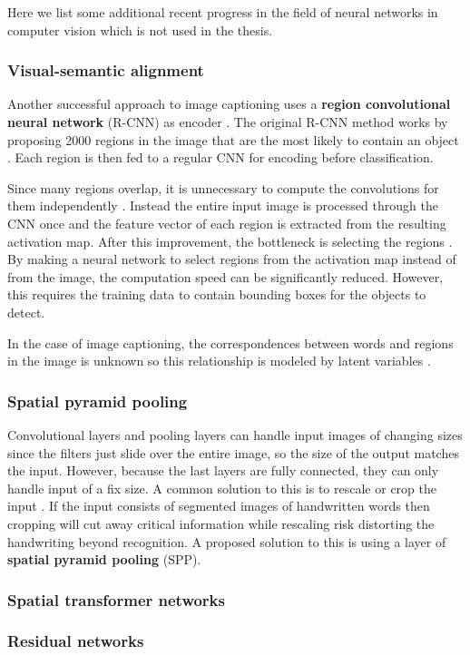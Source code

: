 Here we list some additional recent progress in the field of neural networks in computer vision which is not used in the thesis.

\subsubsection{Visual-semantic alignment}


Another successful approach to image captioning uses a \textbf{region convolutional neural network} (R-CNN) as encoder \cite{VisualSemanticAlignment}.
The original R-CNN method works by proposing 2000 regions in the image that are the most likely to contain an object \cite{RCNN}. Each region is then fed to a regular CNN for encoding before classification.

Since many regions overlap, it is unnecessary to compute the convolutions for them independently \cite{FastRCNN}. Instead the entire input image is processed through the CNN once and the feature vector of each region is extracted from the resulting activation map. After this improvement, the bottleneck is selecting the regions \cite{FasterRCNN}. By making a neural network to select regions from the activation map instead of from the image, the computation speed can be significantly reduced. However, this requires the training data to contain bounding boxes for the objects to detect.

In the case of image captioning, the correspondences between words and regions in the image is unknown so this relationship is modeled by latent variables \cite{VisualSemanticAlignment}.

\subsubsection{Spatial pyramid pooling}

Convolutional layers and pooling layers can handle input images of changing sizes since the filters just slide over the entire image, so the size of the output matches the input.
However, because the last layers are fully connected, they can only handle input of a fix size. A common solution to this is to rescale or crop the input \cite{FornesCnnCategorization}. If the input consists of segmented images of handwritten words then cropping will cut away critical information while rescaling risk distorting the handwriting beyond recognition. A proposed solution to this is using a layer of \textbf{spatial pyramid pooling} (SPP).

\subsubsection{Spatial transformer networks}


\subsubsection{Residual networks}

